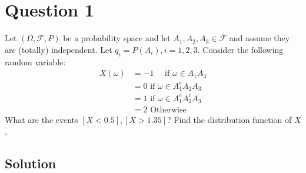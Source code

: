 \section*{Question 1}

Let \( (\Omega, \mathcal{F}, P) \) be a probability space and let \( A_{1}, A_{2}, A_{3} \in \mathcal{F} \) and assume they are (totally) independent.
Let \( q_{i}=P\left(A_{i}\right), i=1,2,3 \).
Consider the following random variable:
\begin{align*}
    X(\omega)
     & =
    -1 \quad \text { if } \omega \in A_{1} A_{3}
    \\ & =
    0 \text { if } \omega \in A_{1}^{c} A_{2} A_{3}
    \\ & =
    1 \text { if } \omega \in A_{1}^{c} A_{2}^{c} A_{3}
    \\ & =
    2 \text { Otherwise }
\end{align*}
What are the events \( [X<0.5],[X>1.35] \)?
Find the distribution function of \( X \).

\subsection*{Solution}

